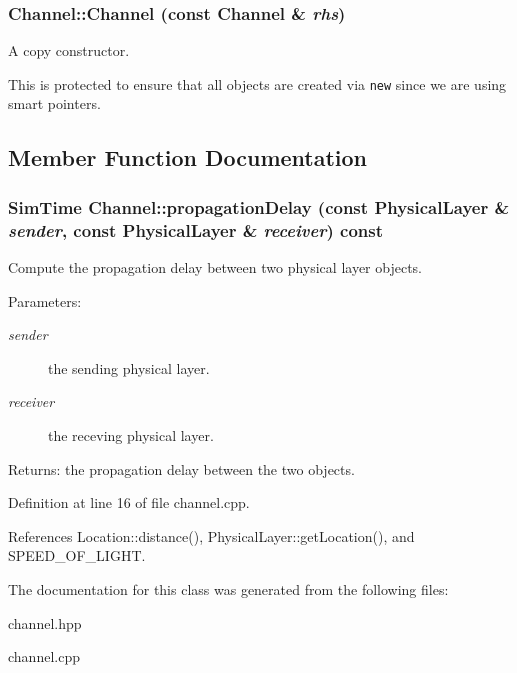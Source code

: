 \subsubsection{\setlength{\rightskip}{0pt plus 5cm}Channel::Channel (const \bf{Channel} \& {\em rhs})\hspace{0.3cm}{\tt  [protected]}}\label{classChannel_4bee049fc3ff144e7273e29fe11a0ec4}


A copy constructor. 

This is protected to ensure that all objects are created via {\tt new} since we are using smart pointers. 

\subsection{Member Function Documentation}
\subsubsection{\setlength{\rightskip}{0pt plus 5cm}\bf{Sim\-Time} Channel::propagation\-Delay (const \bf{Physical\-Layer} \& {\em sender}, const \bf{Physical\-Layer} \& {\em receiver}) const\hspace{0.3cm}{\tt  [virtual]}}\label{classChannel_9ca936663d2dbb0236fc7df48ad23b26}


Compute the propagation delay between two physical layer objects. 

\begin{Desc}
\item[Parameters:]
\begin{description}
\item[{\em sender}]the sending physical layer. \item[{\em receiver}]the receving physical layer. \end{description}
\end{Desc}
\begin{Desc}
\item[Returns:]the propagation delay between the two objects. \end{Desc}


Definition at line 16 of file channel.cpp.

References Location::distance(), Physical\-Layer::get\-Location(), and SPEED\_\-OF\_\-LIGHT.

The documentation for this class was generated from the following files:\begin{CompactItemize}
\item 
channel.hpp\item 
channel.cpp\end{CompactItemize}
